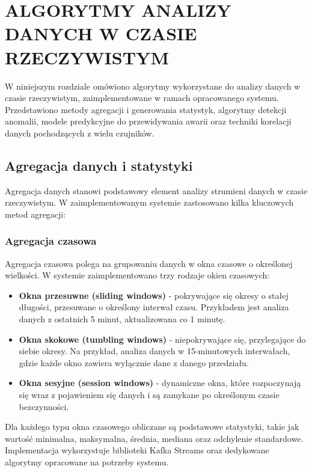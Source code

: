 \section{ALGORYTMY ANALIZY DANYCH W CZASIE RZECZYWISTYM}
\label{sec:algorytmy_analizy}

W niniejszym rozdziale omówiono algorytmy wykorzystane do analizy danych w czasie rzeczywistym, zaimplementowane w ramach opracowanego systemu. Przedstawiono metody agregacji i generowania statystyk, algorytmy detekcji anomalii, modele predykcyjne do przewidywania awarii oraz techniki korelacji danych pochodzących z wielu czujników.

\subsection{Agregacja danych i statystyki}
\label{subsec:agregacja_statystyki}

Agregacja danych stanowi podstawowy element analizy strumieni danych w czasie rzeczywistym. W zaimplementowanym systemie zastosowano kilka kluczowych metod agregacji:

\subsubsection{Agregacja czasowa}
\label{subsubsec:agregacja_czasowa}

Agregacja czasowa polega na grupowaniu danych w okna czasowe o określonej wielkości. W systemie zaimplementowano trzy rodzaje okien czasowych:

\begin{itemize}
    \item \textbf{Okna przesuwne (sliding windows)} - pokrywające się okresy o stałej długości, przesuwane o określony interwał czasu. Przykładem jest analiza danych z ostatnich 5 minut, aktualizowana co 1 minutę.
    \item \textbf{Okna skokowe (tumbling windows)} - niepokrywające się, przylegające do siebie okresy. Na przykład, analiza danych w 15-minutowych interwałach, gdzie każde okno zawiera wyłącznie dane z danego przedziału.
    \item \textbf{Okna sesyjne (session windows)} - dynamiczne okna, które rozpoczynają się wraz z pojawieniem się danych i są zamykane po określonym czasie bezczynności.
\end{itemize}

Dla każdego typu okna czasowego obliczane są podstawowe statystyki, takie jak wartość minimalna, maksymalna, średnia, mediana oraz odchylenie standardowe. Implementacja wykorzystuje biblioteki Kafka Streams oraz dedykowane algorytmy opracowane na potrzeby systemu.

